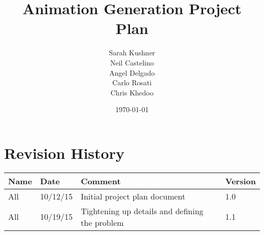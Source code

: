 \documentclass[12pt]{article}
\begin{document}
\title{Animation Generation Project Plan}
\author{Sarah Kushner \\
		Neil Castelino \\
		Angel Delgado \\
		Carlo Rosati \\
		Chris Khedoo}
\date{\today}
\maketitle

\pagebreak
\tableofcontents
\pagebreak

\section{Revision History}
\begin{table}[hp]
\centering
\begin{tabular}{|l|l|l|l|}
\hline
Name 		& Date	 		& 	Comment	 								& 	Version	 \\ \hline
All		& 10/12/15		& 	Initial project plan document			&  	1.0 		 \\ \hline
All		& 10/19/15		& 	Tightening up details and defining the problem			&  	1.1 		 \\ \hline
\end{tabular}
\end{table}

\pagebreak















\end{document}
